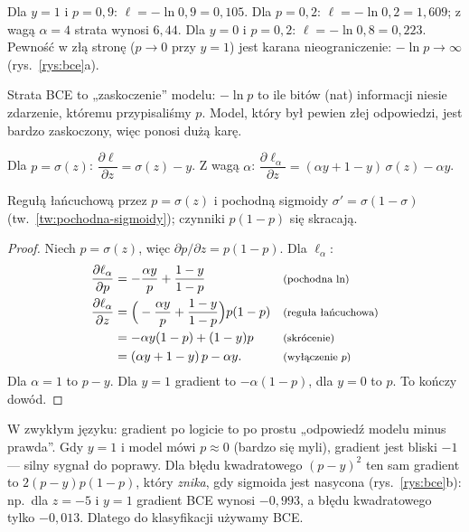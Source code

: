 \begin{przyklad}\label{prz:bce}
Dla $y=1$ i $p=0{,}9$: $\ell=-\ln0{,}9=0{,}105$. Dla $p=0{,}2$: $\ell=-\ln0{,}2=1{,}609$; z wagą $\alpha=4$ strata wynosi $6{,}44$. Dla $y=0$ i $p=0{,}2$: $\ell=-\ln0{,}8=0{,}223$.
Pewność w złą stronę ($p\to0$ przy $y=1$) jest karana nieograniczenie: $-\ln p\to\infty$ (rys.~\ref{rys:bce}a).
\end{przyklad}

\begin{intuicja}
Strata BCE to „zaskoczenie” modelu: $-\ln p$ to ile bitów (nat) informacji niesie zdarzenie, któremu przypisaliśmy $p$. Model, który
był pewien złej odpowiedzi, jest bardzo zaskoczony, więc ponosi dużą karę.
\end{intuicja}

\begin{twierdzenie}\label{tw:grad-bce}
Dla $p=\sigma(z)$: $\dfrac{\partial\ell}{\partial z}=\sigma(z)-y$. Z wagą $\alpha$: $\dfrac{\partial\ell_\alpha}{\partial z}=(\alpha y+1-y)\,\sigma(z)-\alpha y$.
\end{twierdzenie}
\begin{pomyslDowodu}
Regułą łańcuchową przez $p=\sigma(z)$ i pochodną sigmoidy $\sigma'=\sigma(1-\sigma)$ (tw.~\ref{tw:pochodna-sigmoidy}); czynniki $p(1-p)$ się skracają.
\end{pomyslDowodu}
\begin{proof}
Niech $p=\sigma(z)$, więc $\partial p/\partial z=p(1-p)$. Dla $\ell_\alpha$:
\begin{align*}
\frac{\partial\ell_\alpha}{\partial p} &= -\frac{\alpha y}{p}+\frac{1-y}{1-p} && \text{\footnotesize (pochodna $\ln$)}\\
\frac{\partial\ell_\alpha}{\partial z} &= \Big(-\frac{\alpha y}{p}+\frac{1-y}{1-p}\Big)p(1-p) && \text{\footnotesize (reguła łańcuchowa)}\\
 &= -\alpha y(1-p)+(1-y)p && \text{\footnotesize (skrócenie)}\\
 &= (\alpha y+1-y)\,p-\alpha y. && \text{\footnotesize (wyłączenie $p$)}
\end{align*}
Dla $\alpha=1$ to $p-y$. Dla $y=1$ gradient to $-\alpha(1-p)$, dla $y=0$ to $p$. To kończy dowód.
\end{proof}

W zwykłym języku: gradient po logicie to po prostu „odpowiedź modelu minus prawda”. Gdy $y=1$ i model mówi $p\approx0$ (bardzo się myli), gradient jest bliski $-1$ --- silny sygnał do poprawy.
Dla błędu kwadratowego $(p-y)^2$ ten sam gradient to $2(p-y)p(1-p)$, który \emph{znika}, gdy sigmoida jest nasycona
(rys.~\ref{rys:bce}b): np.\ dla $z=-5$ i $y=1$ gradient BCE wynosi $-0{,}993$, a błędu kwadratowego tylko $-0{,}013$. Dlatego do klasyfikacji używamy BCE.

